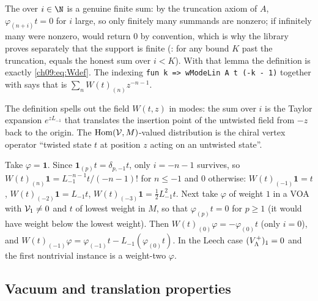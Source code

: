 \begin{dictionary}
The  over $i\in\N$ is a genuine finite sum: by the truncation axiom of $A$,
$\varphi_{(n+i)}t=0$ for $i$ large, so only finitely many summands are nonzero; if infinitely many
were nonzero,  would return $0$ by convention, which is why the library proves
separately that the support is finite (: for any bound $K$ past the truncation,
 equals the honest sum over $i<K$). With that lemma the definition is exactly
\eqref{ch09:eq:Wdef}. The indexing \texttt{fun k => wModeLin A t (-k - 1)} together with
 says that  is $\sum_nW(t)_{(n)}z^{-n-1}$.
\end{dictionary}

\begin{physics}
The definition spells out the field $W(t,z)$ in modes: the sum over $i$ is the Taylor expansion $e^{zL_{-1}}$ that translates the insertion point of the untwisted field from $-z$ back to the origin. The $\mathrm{Hom}(\mathcal{V},M)$-valued distribution is the chiral vertex operator ``twisted state $t$ at position $z$ acting on an untwisted state''.
\end{physics}

\begin{example}\label{ch09:ex:lowmodes}
Take $\varphi=\mathbf 1$. Since $\mathbf 1_{(p)}t=\delta_{p,-1}t$, only $i=-n-1$ survives, so
$W(t)_{(n)}\mathbf 1=L_{-1}^{-n-1}t/(-n-1)!$ for $n\le-1$ and $0$ otherwise: $W(t)_{(-1)}\mathbf1=t$,
$W(t)_{(-2)}\mathbf 1=L_{-1}t$, $W(t)_{(-3)}\mathbf 1=\tfrac12L_{-1}^2t$. Next take $\varphi$ of
weight $1$ in a VOA with $\mathcal{V}_1\neq0$ and $t$ of lowest weight in $M$, so that
$\varphi_{(p)}t=0$ for $p\ge1$ (it would have weight below the lowest weight). Then
$W(t)_{(0)}\varphi=-\varphi_{(0)}t$ (only $i=0$), and
$W(t)_{(-1)}\varphi=\varphi_{(-1)}t-L_{-1}(\varphi_{(0)}t)$. In the Leech case $(V_{\Lambda}^{+})_1=0$
and the first nontrivial instance is a weight-two $\varphi$.
\end{example}

\subsection{Vacuum and translation properties}

